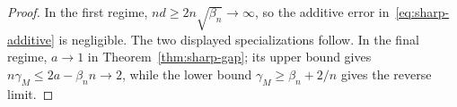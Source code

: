 \begin{proof}
In the first regime, $nd\ge2n\sqrt{\beta_n}\to\infty$,
so the additive error in~\eqref{eq:sharp-additive} is negligible.
The two displayed specializations follow. In the final regime,
$a\to1$ in Theorem~\ref{thm:sharp-gap}; its upper bound gives
$n\gamma_M\le2a-\beta_n n\to2$, while the lower bound
$\gamma_M\ge\beta_n+2/n$ gives the reverse limit.
\end{proof}
